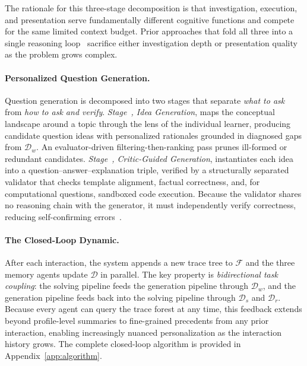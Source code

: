 The rationale for this three-stage decomposition is that investigation, execution, and presentation serve fundamentally different cognitive functions and compete for the same limited context budget.
Prior approaches that fold all three into a single reasoning loop~\citep{yao2023reactsynergizingreasoningacting,wu-etal-2025-agentic} sacrifice either investigation depth or presentation quality as the problem grows complex.

\paragraph{Personalized Question Generation.}
Question generation is decomposed into two stages that separate \emph{what to ask} from \emph{how to ask and verify}.
\emph{Stage~, Idea Generation}, maps the conceptual landscape around a topic through the lens of the individual learner, producing candidate question ideas with personalized rationales grounded in diagnosed gaps from $\mathcal{D}_w$.
An evaluator-driven filtering-then-ranking pass prunes ill-formed or redundant candidates.
\emph{Stage~, Critic-Guided Generation}, instantiates each idea into a question--answer--explanation triple, verified by a structurally separated validator that checks template alignment, factual correctness, and, for computational questions, sandboxed code execution.
Because the validator shares no reasoning chain with the generator, it must independently verify correctness, reducing self-confirming errors~\citep{spiliopoulou2025playfavorites}.

\paragraph{The Closed-Loop Dynamic.}
\label{sec:cycle}
After each interaction, the system appends a new trace tree to $\mathcal{F}$ and the three memory agents update $\mathcal{D}$ in parallel.
The key property is \emph{bidirectional task coupling}: the solving pipeline feeds the generation pipeline through $\mathcal{D}_w$, and the generation pipeline feeds back into the solving pipeline through $\mathcal{D}_s$ and $\mathcal{D}_r$.
Because every agent can query the trace forest at any time, this feedback extends beyond profile-level summaries to fine-grained precedents from any prior interaction, enabling increasingly nuanced personalization as the interaction history grows.
The complete closed-loop algorithm is provided in Appendix~\ref{app:algorithm}.


